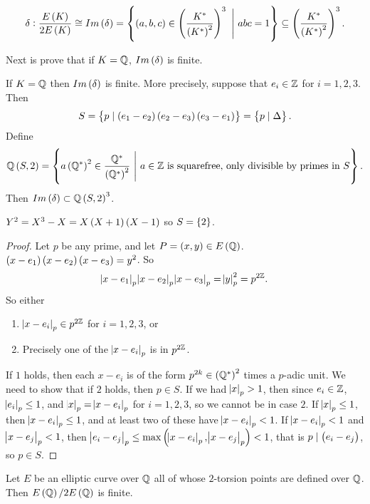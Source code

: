 \pagebreak

$$ \delta : \dfrac{E\br{K}}{2E\br{K}} \cong Im\br{\delta} = \cbr{\br{a, b, c} \in \br{\dfrac{K^*}{\br{K^*}^2}}^3 \ \Bigg| \ abc = 1} \subseteq \br{\dfrac{K^*}{\br{K^*}^2}}^3. $$


Next is prove that if $ K = \mathbb{Q} $, $ Im\br{\delta} $ is finite.

\begin{proposition}
\label{prop:8.5}
If $ K = \mathbb{Q} $ then $ Im\br{\delta} $ is finite. More precisely, suppose that $ e_i \in \mathbb{Z} $ for $ i = 1, 2, 3 $. Then
$$ S = \cbr{p \mid \br{e_1 - e_2}\br{e_2 - e_3}\br{e_3 - e_1}} = \cbr{p \mid \Delta}. $$
Define
$$ \Q\br{S, 2} = \cbr{a\br{\Q^*}^2 \in \dfrac{\Q^*}{\br{\Q^*}^2} \ \Bigg| \ a \in \Z \ \text{is squarefree, only divisible by primes in} \ S}. $$
Then $ Im\br{\delta} \subset \Q\br{S, 2}^3 $.
\end{proposition}

\begin{example*}
$ Y^2 = X^3 - X = X\br{X + 1}\br{X - 1} $ so $ S = \cbr{2} $.
\end{example*}

\begin{proof}
Let $ p $ be any prime, and let $ P = \br{x, y} \in E\br{\Q} $. $ \br{x - e_1}\br{x - e_2}\br{x - e_3} = y^2 $. So
$$ \abs{x - e_1}_p\abs{x - e_2}_p\abs{x - e_3}_p = \abs{y}_p^2 = p^{2\mathbb{Z}}. $$
So either
\begin{enumerate}
\item $ \abs{x - e_i}_p \in p^{2\mathbb{Z}} $ for $ i = 1, 2, 3 $, or
\item Precisely one of the $ \abs{x - e_i}_p $ is in $ p^{2\mathbb{Z}} $.
\end{enumerate}
If $ 1 $ holds, then each $ x - e_i $ is of the form $ p^{2k} \in \br{\Q^*}^2 $ times a $ p $-adic unit. We need to show that if $ 2 $ holds, then $ p \in S $. If we had $ \abs{x}_p > 1 $, then since $ e_i \in \mathbb{Z} $, $ \abs{e_i}_p \le 1 $, and $ \abs{x}_p = \abs{x - e_i}_p $ for $ i = 1, 2, 3 $, so we cannot be in case $ 2 $. If $ \abs{x}_p \le 1 $, then $ \abs{x - e_i}_p \le 1 $, and at least two of these have $ \abs{x - e_i}_p < 1 $. If $ \abs{x - e_i}_p < 1 $ and $ \abs{x - e_j}_p < 1 $, then $ \abs{e_i - e_j}_p \le \max\br{\abs{x - e_i}_p, \abs{x - e_j}_p} < 1 $, that is $ p \mid \br{e_i - e_j} $, so $ p \in S $.
\end{proof}

\begin{theorem}
Let $ E $ be an elliptic curve over $ \mathbb{Q} $ all of whose $ 2 $-torsion points are defined over $ \mathbb{Q} $. Then $ E\br{\Q} / 2E\br{\Q} $ is finite.
\end{theorem}

